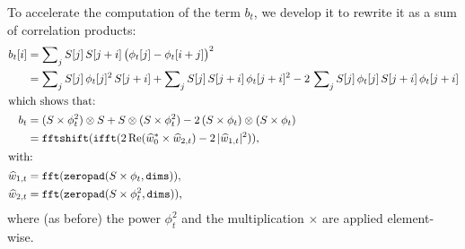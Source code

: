 \documentclass{article}
\renewcommand*{\Re}{\mathrm{Re}}
\begin{document}
To accelerate the computation of the term $b_{t}$, we develop it to rewrite it as a sum of correlation products:
\begin{align}
  b_{t}[i]
  &= \sum\nolimits_{j} S[j]\,S[j+i]\,
    \bigl(\phi_{t}[j] - \phi_{t}[i+j]\bigr)^{2}\notag\\
  &= \sum\nolimits_{j} S[j]\,\phi_{t}[j]^{2}\,S[j+i]
    + \sum\nolimits_{j} S[j]\,S[j+i]\,\phi_{t}[j+i]^{2}
    - 2\,\sum\nolimits_{j} S[j]\,\phi_{t}[j]\,S[j+i]\,\phi_{t}[j+i]\notag\\
\intertext{which shows that:}
  b_{t}
  &= (S \times \phi_{t}^{2}) \otimes S
    + S \otimes (S \times \phi_{t}^{2})
    - 2\,(S \times \phi_{t}) \otimes (S \times \phi_{t})\\
  \label{eq:fast_b}
  &= \mathtt{fftshift}(\mathtt{ifft}(
    2\,\Re(\widehat{w}_{0}^{*} \times \widehat{w}_{2,t})
    - 2\,|\widehat{w}_{1,t}|^{2})
  ), \\
  \intertext{with:}
  \widehat{w}_{1,t}
  &= \mathtt{fft}(\mathtt{zeropad}(S \times \phi_{t}, \mathtt{dims})),\\
  \widehat{w}_{2,t}
  &= \mathtt{fft}(\mathtt{zeropad}(S \times \phi_{t}^{2}, \mathtt{dims})),
\end{align}
where (as before) the power $\phi_{t}^{2}$ and the multiplication $\times$ are
applied element-wise.
\end{document}
